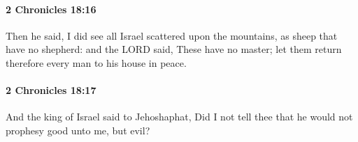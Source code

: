 		\paragraph{2 Chronicles 18:16} %
			\label{2CHRONICLES-18-16}

			Then he said, I did see all Israel scattered upon the mountains, as sheep that have no shepherd: and the LORD said, These have no master; let them return therefore every man to his house in peace.


		\paragraph{2 Chronicles 18:17} %
			\label{2CHRONICLES-18-17}

			And the king of Israel said to Jehoshaphat, Did I not tell thee that he would not prophesy good unto me, but evil?


